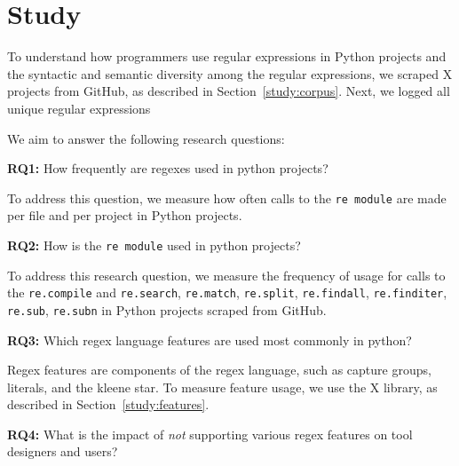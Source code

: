 \section{Study}
\label{sec:study}


To understand how programmers use regular expressions in Python projects and the syntactic and semantic diversity among the regular expressions, we scraped X projects from GitHub, as described in Section~\ref{study:corpus}. Next, we logged all unique regular expressions 

We aim to answer the following research questions:

\textbf{RQ1:} How frequently are regexes used in python projects?

To address this question, we measure how often  calls to the {\tt re module} are made per file and per project in Python projects. 


\textbf{RQ2:} How is the {\tt re module} used in python projects?

To address this research question, we measure the frequency of usage for calls to the {\tt re.compile} and {\tt re.search}, {\tt re.match}, {\tt re.split}, {\tt re.findall}, {\tt re.finditer}, {\tt re.sub}, {\tt re.subn} in Python projects scraped from GitHub. 


\textbf{RQ3:} Which regex language features are used most commonly in python?

Regex features are components of the regex language, such as capture groups, literals, and the kleene star. To measure feature usage, we use the X library, as described in Section~\ref{study:features}. 

\textbf{RQ4:} What is the impact of \emph{not} supporting various regex features on tool designers and users?

